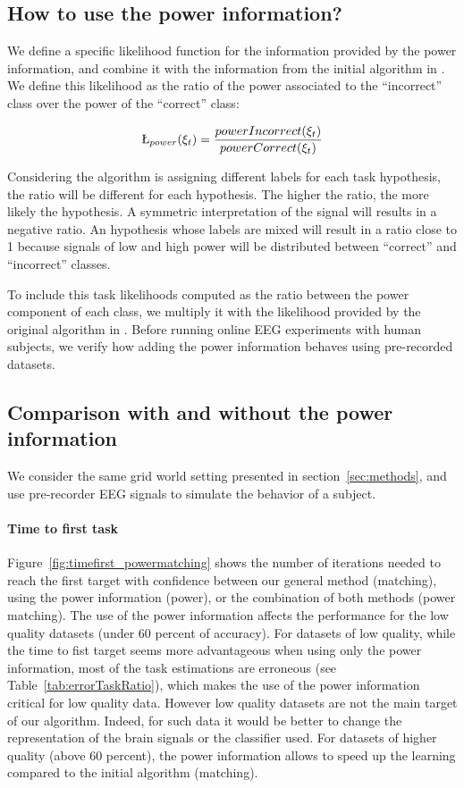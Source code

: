 \subsection{How to use the power information?}

We define a specific likelihood function for the information provided by the power information, and combine it with the information from the initial algorithm in \cite{grizou2014interactive}. We define this likelihood as the ratio of the power associated to the ``incorrect'' class over the power of the ``correct'' class:

\begin{eqnarray}
\L_{power}(\xi_t) = \frac{powerIncorrect(\xi_t)}{powerCorrect(\xi_t)}
\label{eq:power}
\end{eqnarray}

Considering the algorithm is assigning different labels for each task hypothesis, the ratio will be different for each hypothesis. The higher the ratio, the more likely the hypothesis. A symmetric interpretation of the signal will results in a negative ratio. An hypothesis whose labels are mixed will result in a ratio close to 1 because signals of low and high power will be distributed between ``correct'' and ``incorrect'' classes. 

To include this task likelihoods computed as the ratio between the power component of each class, we multiply it with the likelihood provided by the original algorithm in \cite{grizou2014interactive}. Before running online EEG experiments with human subjects, we verify how adding the power information behaves using pre-recorded datasets. 

\subsection{Comparison with and without the power information}

We consider the same grid world setting presented in section~\ref{sec:methods}, and use pre-recorder EEG signals to simulate the behavior of a subject.

\paragraph{Time to first task} Figure~\ref{fig:timefirst_powermatching} shows the number of iterations needed to reach the first target with confidence between our general method (matching), using the power information (power), or the combination of both methods (power matching). The use of the power information affects the performance for the low quality datasets (under 60 percent of accuracy). For datasets of low quality, while the time to fist target seems more advantageous when using only the power information, most of the task estimations are erroneous (see Table~\ref{tab:errorTaskRatio}), which makes the use of the power information critical for low quality data. However low quality datasets are not the main target of our algorithm. Indeed, for such data it would be better to change the representation of the brain signals or the classifier used. For datasets of higher quality (above 60 percent), the power information allows to speed up the learning compared to the initial algorithm (matching).

